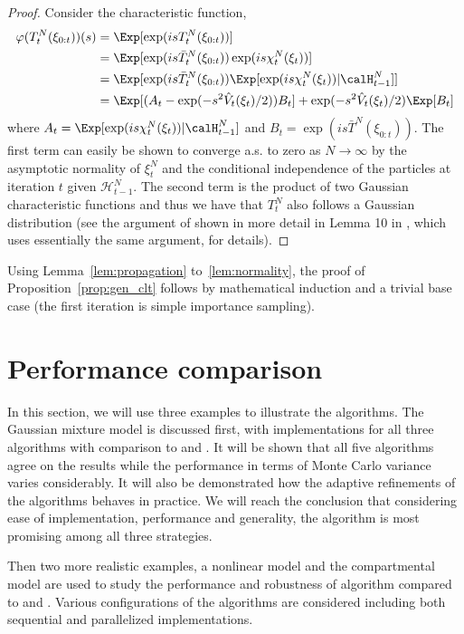 \begin{proof}
  Consider the characteristic function,
  \begin{align*}
    \varphi(T_t^N(\xi_{0:t}))(s)
    &= \Exp[\exp(isT_t^N(\xi_{0:t}))] \\
    &= \Exp[\exp(is\bar{T}_t^N(\xi_{0:t}))\exp(is\chi_t^N(\xi_t))] \\
    &= \Exp[\exp(is\bar{T}_t^N(\xi_{0:t}))
    \Exp[\exp(is\chi_t^N(\xi_t))|\calH_{t-1}^N]] \\
    &= \Exp[(A_t - \exp(-s^2\hat{V}_t(\xi_t)/2))B_t]
    +\exp(-s^2\hat{V}_t(\xi_t)/2)\Exp[B_t]
  \end{align*}
  where $A_t = \Exp[\exp(is\chi_t^N(\xi_t))|\calH_{t-1}^N]$ and $B_t =
  \exp(is\bar{T}^N(\xi_{0:t}))$. The first term can easily be shown to
  converge a.s. to zero as $N\to\infty$ by the asymptotic normality of
  $\xi_t^N$ and the conditional independence of the particles at iteration $t$
  given $\mathcal{H}_{t-1}^N$. The second term is the product of two Gaussian
  characteristic functions and thus we have that $T_t^N$ also follows a
  Gaussian distribution (see the argument of \cite{Kuensch:2005} shown in more
  detail in Lemma 10{} in \cite{Johansen:2006iv}, which uses essentially the
  same argument, for details).
\end{proof}

Using Lemma~\ref{lem:propagation} to~\ref{lem:normality}, the proof of
Proposition~\ref{prop:gen_clt} follows by mathematical induction and a trivial
base case (the first iteration is simple importance sampling).

\section{Performance comparison}
\label{sec:Performance comparison}

In this section, we will use three examples to illustrate the algorithms. The
Gaussian mixture model is discussed first, with implementations for all three
\smc algorithms with comparison to \rjmcmc and \pmcmc. It will be shown that
all five algorithms agree on the results while the performance in
terms of Monte Carlo variance varies considerably. It will also be
demonstrated how the adaptive refinements of the algorithms behaves in
practice. We will reach the conclusion that considering ease of
implementation, performance and generality, the \smc[2] algorithm is most
promising among all three strategies.

Then two more realistic examples, a nonlinear \ode model and the \pet
compartmental model are used to study the performance and robustness of
algorithm \smc[2] compared to \ais and \pmcmc. Various configurations of the
algorithms are considered including both sequential and parallelized
implementations.

